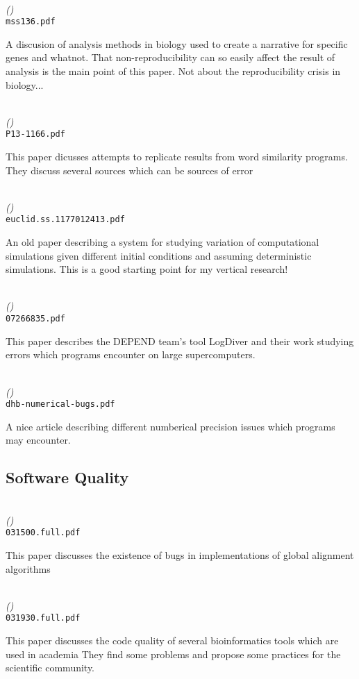 \documentclass{article}
\newenvironment{refdef}[2] {
	\noindent \textbf{\citetitle{#1}} \cite{#1}\\ \citejournalorbooktitle{#1} \textit{(\citeyear{#1})}\\ \texttt{#2} \vspace{0.2in} \par 
} {
\vspace{0.2in}
}
\begin{document}
\begin{refdef}{doi:10.1093/molbev/mss136}{mss136.pdf}
A discusion of analysis methods in biology used to create a narrative for specific genes and whatnot. That non-reproducibility can so easily affect the result of analysis is the main point of this paper. Not about the reproducibility crisis in biology...
\end{refdef}

\begin{refdef}{FokkensPostmaPedersen}{P13-1166.pdf}
This paper dicusses attempts to replicate results from word similarity programs. They discuss several sources which can be sources of error
\end{refdef}

\begin{refdef}{sacks1989}{euclid.ss.1177012413.pdf}
An old paper describing a system for studying variation of computational simulations given different initial conditions and assuming deterministic simulations. This is a good starting point for my vertical research!
\end{refdef}

\begin{refdef}{DEPEND-Resiliance}{07266835.pdf}
This paper describes the DEPEND team's tool LogDiver and their work studying errors which programs encounter on large supercomputers.
\end{refdef}

\begin{refdef}{dhb-numerical-bugs}{dhb-numerical-bugs.pdf}
A nice article describing different numberical precision issues which programs may encounter.
\end{refdef}

\subsection{Software Quality}

\begin{refdef}{Flouri031500}{031500.full.pdf}
This paper discusses the existence of bugs in implementations of global alignment algorithms
\end{refdef}

\begin{refdef}{Darriba031930}{031930.full.pdf}
This paper discusses the code quality of several bioinformatics tools which are used in academia They find some problems and propose some practices for the scientific community.
\end{refdef}
\end{document}

